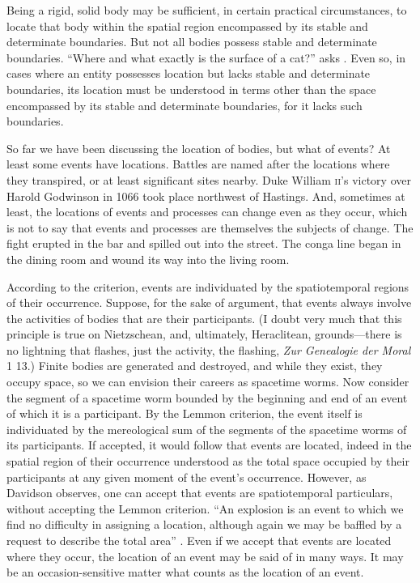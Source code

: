Being a rigid, solid body may be sufficient, in certain practical circumstances, to locate that body within the spatial region encompassed by its stable and determinate boundaries. But not all bodies possess stable and determinate boundaries. ``Where and what exactly is the surface of a cat?'' asks \citet[lecture 9]{Austin:1962lr}. Even so, in cases where an entity possesses location but lacks stable and determinate boundaries, its location must be understood in terms other than the space encompassed by its stable and determinate boundaries, for it lacks such boundaries.

So far we have been discussing the location of bodies, but what of events? At least some events have locations. Battles are named after the locations where they transpired, or at least significant sites nearby. Duke William \textsc{ii}'s victory over Harold Godwinson in 1066 took place northwest of Hastings. And, sometimes at least, the locations of events and processes can change even as they occur, which is not to say that events and processes are themselves the subjects of change. The fight erupted in the bar and spilled out into the street. The conga line began in the dining room and wound its way into the living room.

According to the \citet{Lemmon:1967aa} criterion, events are individuated by the spatiotemporal regions of their occurrence. Suppose, for the sake of argument, that events always involve the activities of bodies that are their participants. (I doubt very much that this principle is true on Nietzschean, and, ultimately, Heraclitean, grounds---there is no lightning that flashes, just the activity, the flashing, \emph{Zur Genealogie der Moral} 1 13.) Finite bodies are generated and destroyed, and while they exist, they occupy space, so we can envision their careers as spacetime worms. Now consider the segment of a spacetime worm bounded by the beginning and end of an event of which it is a participant. By the Lemmon criterion, the event itself is individuated by the mereological sum of the segments of the spacetime worms of its participants. If accepted, it would follow that events are located, indeed in the spatial region of their occurrence understood as the total space occupied by their participants at any given moment of the event's occurrence. However, as Davidson observes, one can accept that events are spatiotemporal particulars, without accepting the Lemmon criterion. ``An explosion is an event to which we find no difficulty in assigning a location, although again we may be baffled by a request to describe the total area'' \citep[304]{Davidson:1969da}. Even if we accept that events are located where they occur, the location of an event may be said of in many ways. It may be an occasion-sensitive matter what counts as the location of an event. 

